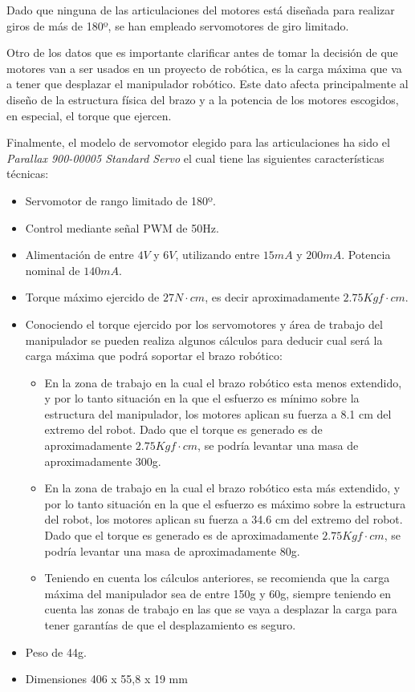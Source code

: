 Dado que ninguna de las articulaciones del motores está diseñada para realizar giros de más de 180º, se han empleado servomotores de giro limitado.

Otro de los datos que es importante clarificar antes de tomar la decisión de que motores van a ser usados en un proyecto de robótica, es la carga máxima que va a tener que desplazar el manipulador robótico. Este dato afecta principalmente al diseño de la estructura física del brazo y a la potencia de los motores escogidos, en especial, el torque que ejercen. 

Finalmente, el modelo de servomotor elegido para las articulaciones ha sido el \textit{Parallax 900-00005 Standard Servo} el cual tiene las siguientes características técnicas:

\begin{itemize}
    \item Servomotor de rango limitado de 180º.
    \item Control mediante señal \ac{PWM} de 50Hz.
    \item Alimentación de entre $4V$ y $6V$, utilizando entre $15mA$ y $200mA$. Potencia nominal de $140mA$.
    \item Torque máximo ejercido de $27N\cdot cm$, es decir aproximadamente $2.75 Kgf\cdot cm$. 
    \item Conociendo el torque ejercido por los servomotores y área de trabajo del manipulador se pueden realiza algunos cálculos para deducir cual será la carga máxima que podrá soportar el brazo robótico:
    \begin{itemize}
        \item En la zona de trabajo en la cual el brazo robótico esta menos extendido, y por lo tanto situación  en la que el esfuerzo es mínimo sobre la estructura del manipulador, los motores aplican su fuerza a 8.1 cm del extremo del robot. Dado que el torque es generado es de aproximadamente $2.75 Kgf\cdot cm$, se podría levantar una masa de aproximadamente 300g.
        
        \item En la zona de trabajo en la cual el brazo robótico esta más extendido, y por lo tanto situación en la que el esfuerzo es máximo sobre la estructura del robot, los motores aplican su fuerza a 34.6 cm del extremo del robot. Dado que el torque es generado es de aproximadamente $2.75 Kgf\cdot cm$, se podría levantar una masa de aproximadamente 80g.
        
        \item Teniendo en cuenta los cálculos anteriores, se recomienda que la carga máxima del manipulador sea de entre 150g y 60g, siempre teniendo en cuenta las zonas de trabajo en las que se vaya a desplazar la carga para tener garantías de que el desplazamiento es seguro.
    \end{itemize}
    \item Peso de 44g.
    \item Dimensiones 406 x 55,8 x 19 mm
\end{itemize}

